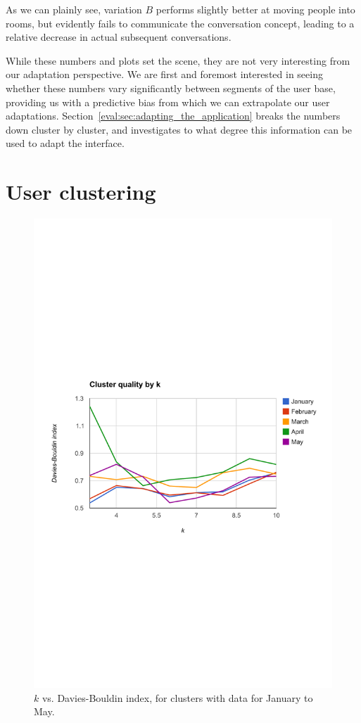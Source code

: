 As we can plainly see, variation $B$ performs slightly better at moving people into rooms, but evidently fails to communicate the conversation concept, leading to a relative decrease in actual subsequent conversations.

While these numbers and plots set the scene, they are not very interesting from our adaptation perspective. We are first and foremost interested in seeing whether these numbers vary significantly between segments of the user base, providing us with a predictive bias from which we can extrapolate our user adaptations. Section~\ref{eval:sec:adapting_the_application} breaks the numbers down cluster by cluster, and investigates to what degree this information can be used to adapt the interface.

\section{User clustering} %
\label{eval:sec:clustering}

\begin{figure}[h]
  \centering
    \includegraphics[width=\textwidth]{Figures/plots/k-vs-db/jan-may}
    \caption{$k$ vs. Davies-Bouldin index, for clusters with data for January to May.}
    \label{fig:k_vs_db}
\end{figure}


